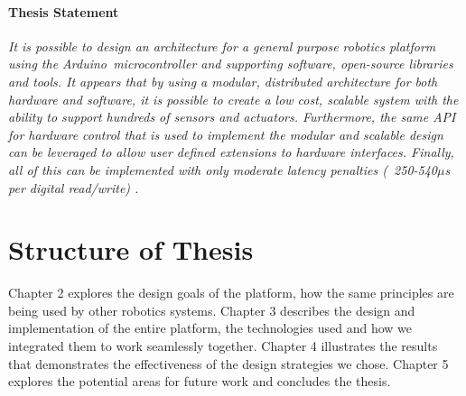 \paragraph*{Thesis Statement}
\textit{It is possible to design an architecture for a general purpose robotics platform using the Arduino\texttrademark\ microcontroller and supporting software, open-source libraries and tools. It appears that by using a modular, distributed architecture for both hardware and software, it is possible to create a low cost, scalable system with the ability to support hundreds of sensors and actuators. Furthermore, the same API for hardware control that is used to implement the modular and scalable design can be leveraged to allow user defined extensions to hardware interfaces. Finally, all of this can be implemented with only moderate latency penalties (~250-540$\mu$s per digital read/write) .} 


\section{Structure of Thesis}
Chapter 2 explores the design goals of the \xten platform, how the same principles are being used by other robotics systems.
Chapter 3 describes the design and implementation of the entire platform, the technologies used and how we integrated them to work seamlessly together.
Chapter 4 illustrates the results that demonstrates the effectiveness of the design strategies we chose.
Chapter 5 explores the potential areas for future work and concludes the thesis.

